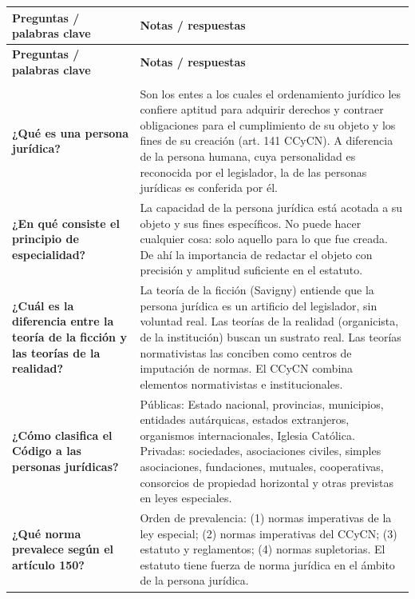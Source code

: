 \documentclass[12pt,oneside]{book}
\newcommand{\cornellhead}{%
\toprule
\textbf{Preguntas / palabras clave} & \textbf{Notas / respuestas} \\
\midrule
}
\begin{document}
\begin{longtable}{
    >{\raggedright\arraybackslash}p{}
    >{\raggedright\arraybackslash}X
}
\cornellhead
\endfirsthead
\cornellhead
\endhead
\midrule
\multicolumn{2}{r}{\textit{continúa en la página siguiente}} \\
\midrule
\endfoot
\bottomrule
\endlastfoot

\textbf{¿Qué es una persona jurídica?} &
Son los entes a los cuales el ordenamiento jurídico les confiere aptitud para adquirir derechos y contraer obligaciones para el cumplimiento de su objeto y los fines de su creación (art. 141 CCyCN). A diferencia de la persona humana, cuya personalidad es reconocida por el legislador, la de las personas jurídicas es conferida por él. \\[0.4em]

\textbf{¿En qué consiste el principio de especialidad?} &
La capacidad de la persona jurídica está acotada a su objeto y sus fines específicos. No puede hacer cualquier cosa: solo aquello para lo que fue creada. De ahí la importancia de redactar el objeto con precisión y amplitud suficiente en el estatuto. \\[0.4em]

\textbf{¿Cuál es la diferencia entre la teoría de la ficción y las teorías de la realidad?} &
La teoría de la ficción (Savigny) entiende que la persona jurídica es un artificio del legislador, sin voluntad real. Las teorías de la realidad (organicista, de la institución) buscan un sustrato real. Las teorías normativistas las conciben como centros de imputación de normas. El CCyCN combina elementos normativistas e institucionales. \\[0.4em]

\textbf{¿Cómo clasifica el Código a las personas jurídicas?} &
Públicas: Estado nacional, provincias, municipios, entidades autárquicas, estados extranjeros, organismos internacionales, Iglesia Católica. Privadas: sociedades, asociaciones civiles, simples asociaciones, fundaciones, mutuales, cooperativas, consorcios de propiedad horizontal y otras previstas en leyes especiales. \\[0.4em]

\textbf{¿Qué norma prevalece según el artículo 150?} &
Orden de prevalencia: (1) normas imperativas de la ley especial; (2) normas imperativas del CCyCN; (3) estatuto y reglamentos; (4) normas supletorias. El estatuto tiene fuerza de norma jurídica en el ámbito de la persona jurídica. \\[0.4em]


\end{longtable}
\end{document}
